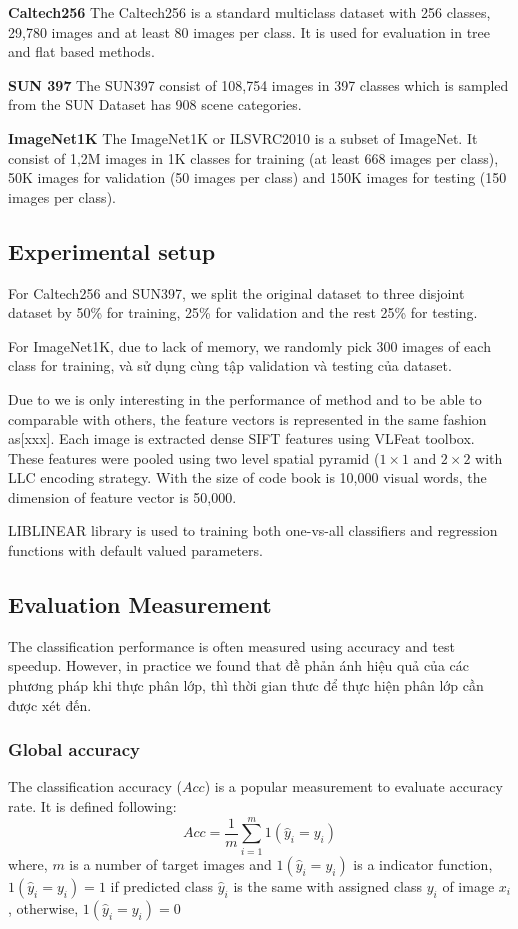 \documentclass[preprint]{elsarticle}
\begin{document}
\textbf{Caltech256} The Caltech256 is a standard multiclass dataset with 256 classes, 29,780 images and at least 80 images per class. It is used for evaluation in tree and flat based methods.

\textbf{SUN 397} The SUN397 consist of 108,754 images in 397 classes which is sampled from the SUN Dataset has 908 scene categories. 

\textbf{ImageNet1K} The ImageNet1K or ILSVRC2010 is a subset of ImageNet. It consist of 1,2M images in 1K classes for training (at least 668 images per class), 50K images for validation (50 images per class) and 150K images for testing (150 images per class).  

\subsection{Experimental setup}
For Caltech256 and SUN397, we split the original dataset to three disjoint dataset by 50\% for training, 25\% for validation and the rest 25\% for testing.

For ImageNet1K, due to lack of memory, we randomly pick 300 images of each class for training,  và sử dụng cùng tập validation và testing của dataset.

Due to we is only interesting in the performance of method and to be able to comparable with others, the feature vectors is represented in the same fashion as[xxx]. Each image is extracted dense SIFT features using VLFeat toolbox. These features were pooled using two level spatial pyramid ($1 \times 1$ and $2 \times 2$ with LLC encoding strategy. With the size of code book is 10,000 visual words, the dimension of feature vector is 50,000.

LIBLINEAR library is used to training both one-vs-all classifiers and regression functions with default valued parameters.

\subsection{Evaluation Measurement}
The classification performance is often measured using accuracy and test speedup. However, in practice we found that đề phản ánh hiệu quả của các phương pháp khi thực phân lớp, thì thời gian thưc để thực hiện phân lớp cần được xét đến. 

\subsubsection{Global accuracy}
 The classification accuracy ($Acc$) is a popular measurement to evaluate accuracy rate. It is defined following:
\begin{equation}
Acc = \frac{1}{m} \sum_{i=1}^{m}  1(\hat{y}_i=y_i)
\end{equation}
where, $m$ is a number of target images and $1(\hat{y}_i=y_i)$ is a indicator function, $1(\hat{y}_i=y_i)=1$ if predicted class $\hat{y}_i$ is the same with assigned class $y_i$ of image $x_i$, otherwise, $1(\hat{y}_i=y_i)=0$
\end{document}
